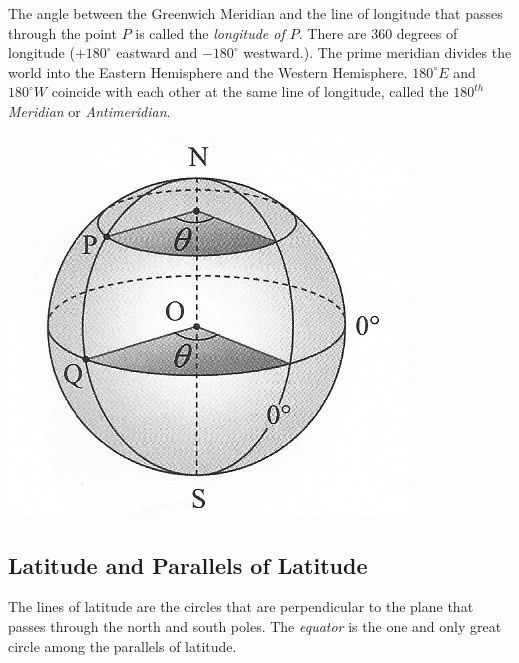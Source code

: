 \documentclass{report}
\begin{document}
\begin{multicols}{2}
    The angle between the Greenwich Meridian and the line of longitude that passes
    through the point $P$ is called the \emph{longitude of $P$}. There are 360
    degrees of longitude ($+180^\circ$ eastward and $-180^\circ$ westward.). The
    prime meridian divides the world into the Eastern Hemisphere and the Western
    Hemisphere. $180^{\circ}E$ and $180^{\circ}W$ coincide with each other at the
    same line of longitude, called the \emph{$180^{th}$ Meridian} or
    \emph{Antimeridian}.

    \begin{center}
        \includegraphics[scale=1.4]{longitude.png}
    \end{center}

    \subsection*{Latitude and Parallels of Latitude}

    The lines of latitude are the circles that are perpendicular to the plane that
    passes through the north and south poles. The \emph{equator} is the one and
    only great circle among the parallels of latitude.


\end{multicols}
\end{document}
